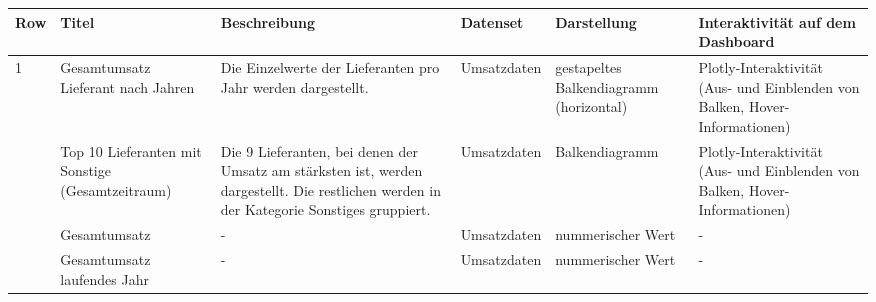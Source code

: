     \begingroup
    \setlength{\tabcolsep}{12pt} %
    \renewcommand{\arraystretch}{1.5} 
    \begin{table}[H]
        \centering
        \begin{adjustbox}{max width=\textwidth}
        \begin{tabular}{p{}p{}p{}p{}p{}p{}}
           \toprule
           Row        &Titel &Beschreibung &Datenset &Darstellung &Interaktivität auf dem Dashboard\\
           \midrule
            1           &Gesamtumsatz Lieferant nach Jahren &Die Einzelwerte der Lieferanten pro Jahr werden dargestellt.   &Umsatzdaten    &gestapeltes Balkendiagramm (horizontal)    &Plotly-Interaktivität (Aus- und Einblenden von Balken, Hover-Informationen)\\
                        &Top 10 Lieferanten mit Sonstige (Gesamtzeitraum)   &Die 9 Lieferanten, bei denen der Umsatz am stärksten ist, werden dargestellt. Die restlichen werden in der Kategorie Sonstiges gruppiert.   &Umsatzdaten    &Balkendiagramm    &Plotly-Interaktivität (Aus- und Einblenden von Balken, Hover-Informationen)\\
                        &Gesamtumsatz&-&Umsatzdaten    &nummerischer Wert   &-\\
                        &Gesamtumsatz laufendes Jahr&-&Umsatzdaten    &nummerischer Wert   &-\\
            

\end{tabular}
\end{adjustbox}
\end{table}
